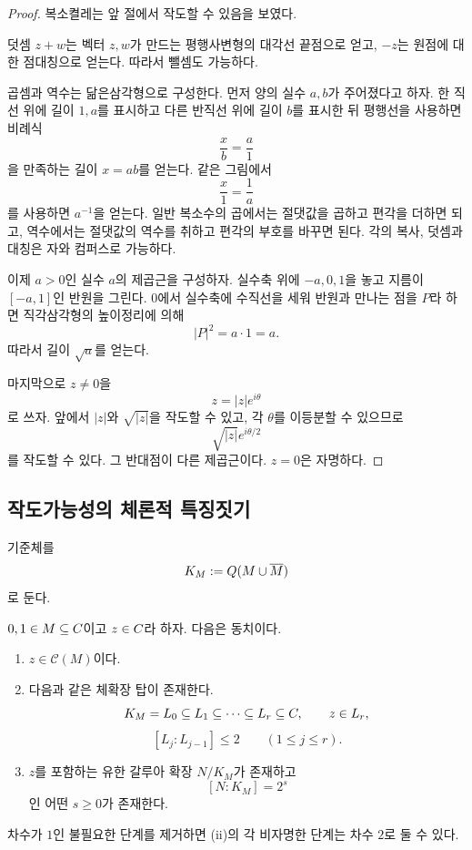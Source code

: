 \begin{proof}
복소켤레는 앞 절에서 작도할 수 있음을 보였다.

덧셈 $z+w$는 벡터 $z,w$가 만드는 평행사변형의 대각선 끝점으로 얻고, $-z$는 원점에 대한 점대칭으로 얻는다. 따라서 뺄셈도 가능하다.

곱셈과 역수는 닮은삼각형으로 구성한다. 먼저 양의 실수 $a,b$가 주어졌다고 하자. 한 직선 위에 길이 $1,a$를 표시하고 다른 반직선 위에 길이 $b$를 표시한 뒤 평행선을 사용하면 비례식
\[
  \frac{x}{b}=\frac{a}{1}
\]
을 만족하는 길이 $x=ab$를 얻는다. 같은 그림에서
\[
  \frac{x}{1}=\frac{1}{a}
\]
를 사용하면 $a^{-1}$을 얻는다. 일반 복소수의 곱에서는 절댓값을 곱하고 편각을 더하면 되고, 역수에서는 절댓값의 역수를 취하고 편각의 부호를 바꾸면 된다. 각의 복사, 덧셈과 대칭은 자와 컴퍼스로 가능하다.

이제 $a>0$인 실수 $a$의 제곱근을 구성하자. 실수축 위에 $-a,0,1$을 놓고 지름이 $[-a,1]$인 반원을 그린다. $0$에서 실수축에 수직선을 세워 반원과 만나는 점을 $P$라 하면 직각삼각형의 높이정리에 의해
\[
  |P|^2=a\cdot1=a.
\]
따라서 길이 $\sqrt a$를 얻는다.

마지막으로 $z\ne0$을
\[
  z=|z|e^{i\theta}
\]
로 쓰자. 앞에서 $|z|$와 $\sqrt{|z|}$을 작도할 수 있고, 각 $\theta$를 이등분할 수 있으므로
\[
  \sqrt{|z|}e^{i\theta/2}
\]
를 작도할 수 있다. 그 반대점이 다른 제곱근이다. $z=0$은 자명하다.
\end{proof}

\subsection{작도가능성의 체론적 특징짓기}

기준체를
\[
  K_M:=Q(M\cup\overline M)
\]
로 둔다.

\begin{theorem}
\label{thm:constructibility-characterization}
$0,1\in M\subseteq C$이고 $z\in C$라 하자. 다음은 동치이다.
\begin{enumerate}[label=(\roman*)]
  \item $z\in\mathcal C(M)$이다.
  \item 다음과 같은 체확장 탑이 존재한다.
  \[
    K_M=L_0\subseteq L_1\subseteq\cdots\subseteq L_r\subseteq C,
    \qquad z\in L_r,
  \]
  \[
    [L_j:L_{j-1}]\le2
    \qquad(1\le j\le r).
  \]
  \item $z$를 포함하는 유한 갈루아 확장 $N/K_M$가 존재하고
  \[
    [N:K_M]=2^s
  \]
  인 어떤 $s\ge0$가 존재한다.
\end{enumerate}
차수가 $1$인 불필요한 단계를 제거하면 (ii)의 각 비자명한 단계는 차수 $2$로 둘 수 있다.
\end{theorem}

